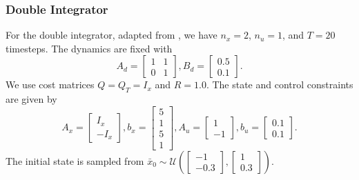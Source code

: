 \documentclass{article} %
\begin{document}
\subsubsection{Double Integrator}
For the double integrator, adapted from \citet{chen2022large}, we have $n_x = 2$, $n_u=1$, and $T=20$ timesteps. The dynamics are fixed with
\begin{equation}
    A_d = \begin{bmatrix}
    1 & 1 \\
    0 & 1
\end{bmatrix}, B_d = \begin{bmatrix}
    0.5 \\ 0.1
\end{bmatrix}.
\end{equation}
We use cost matrices $Q = Q_T = I_x$ and $R = 1.0$. The state and control constraints are given by
\begin{equation}
        A_x = \begin{bmatrix}
            I_x \\ -I_x
        \end{bmatrix}, b_x = \begin{bmatrix}
            5 \\ 1 \\ 5 \\ 1
        \end{bmatrix},
        A_u = \begin{bmatrix}
            1 \\ -1
        \end{bmatrix}, b_u = \begin{bmatrix}
            0.1 \\ 0.1
        \end{bmatrix}.
\end{equation}
The initial state is sampled from $\bar{x}_0 \sim \mathcal{U}\left(\begin{bmatrix} -1 \\ -0.3 \end{bmatrix}, \begin{bmatrix} 1 \\ 0.3 \end{bmatrix}\right).$
\end{document}
